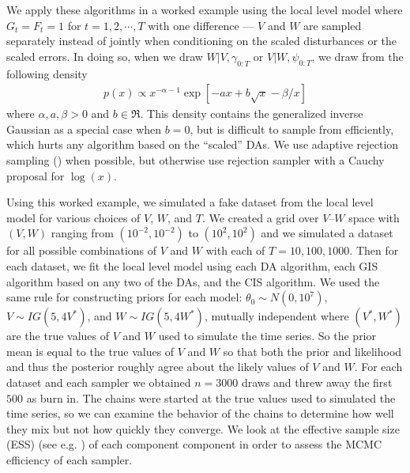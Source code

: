 \documentclass{article}\usepackage[]{graphicx}\usepackage[]{color}
\begin{document}
We apply these algorithms in a worked example using the local level model where $G_t=F_t=1$ for $t=1,2,\cdots,T$ with one difference --- $V$ and $W$ are sampled separately instead of jointly when conditioning on the scaled disturbances or the scaled errors. In doing so, when we draw $W|V,\gamma_{0:T}$ or $V|W,\psi_{0:T}$, we draw from the following density
\begin{align*}
  p(x) \propto x^{-\alpha - 1}\exp\left[ -ax + b\sqrt{x}  -\beta/x\right]
\end{align*}
where $\alpha,a,\beta>0$ and $b\in \Re$. This density contains the generalized inverse Gaussian as a special case when $b=0$, but is difficult to sample from efficiently, which hurts any algorithm based on the ``scaled'' DAs. We use adaptive rejection sampling (\citet{gilks1992adaptive}) when possible, but otherwise use rejection sampler with a Cauchy proposal for $\log(x)$.

Using this worked example, we simulated a fake dataset from the local level model for various choices of $V$, $W$, and $T$. We created a grid over $V$--$W$ space with $(V,W)$ ranging from $(10^{-2},10^{-2})$ to $(10^2, 10^2)$ and we simulated a dataset for all possible combinations of $V$ and $W$ with each of $T=10, 100, 1000$. Then for each dataset, we fit the local level model using each DA algorithm, each GIS algorithm based on any two of the DAs, and the CIS algorithm. We used the same rule for constructing priors for each model: $\theta_0\sim N(0,10^7)$, $V\sim IG(5, 4V^*)$, and $W\sim IG(5, 4W^*)$, mutually independent where $(V^*,W^*)$ are the true values of $V$ and $W$ used to simulate the time series. So the prior mean is equal to the true values of $V$ and $W$ so that both the prior and likelihood and thus the posterior roughly agree about the likely values of $V$ and $W$. For each dataset and each sampler we obtained $n=3000$ draws and threw away the first $500$ as burn in. The chains were started at the true values used to simulated the time series, so we can examine the behavior of the chains to determine how well they mix but not how quickly they converge. We look at the effective sample size (ESS) (see e.g. \citet{gelman2003bayesian}) of each component component in order to assess the MCMC efficiency of each sampler. 
\end{document}
